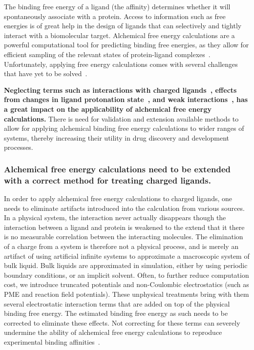 \documentclass[10pt,final]{article}
\begin{document}
The binding free energy of a ligand (the affinity) determines whether it will spontaneously associate with a protein.
%
Access to information such as free energies is of great help in the design of ligands that can selectively and tightly interact with a biomolecular target.
%
Alchemical free energy calculations are a powerful computational tool for predicting binding free energies, as they allow for efficient sampling of the relevant states of protein-ligand complexes~\cite{Shirts2007a}.
%
Unfortunately, applying free energy calculations comes with several challenges that have yet to be solved~\cite{Chodera2011a,Gapsys2015a}. 

%
\textbf{Neglecting terms such as interactions with charged ligands~\cite{Rocklin2013b,Muddana2014a},
effects from changes in ligand protonation state~\cite{Aleksandrov2007a,Czodrowski2007a,Steuber2007a,Czodrowski2007b},
and weak interactions~\cite{Gilson1997a}, has a great impact on the applicability of alchemical free energy calculations.
}%
There is need for validation  and extension available methods to allow for applying alchemical binding free energy calculations to wider ranges of systems,
thereby increasing their utility in drug discovery and development processes.


\subsubsection*{Alchemical free energy calculations need to be extended with a correct method for treating charged ligands.}
In order to apply alchemical free energy calculations to charged ligands, one needs to eliminate artifacts introduced into the calculation from various sources.
%
In a physical system, the interaction never actually disappears though the interaction between a ligand and protein is weakened to the extend that it there is no measurable correlation between the interacting molecules.
%
The elimination of a charge from a system is therefore not a physical process, and is merely an artifact of using artificial infinite systems to approximate a macroscopic system of bulk liquid.
%
Bulk liquids are approximated in simulation, either by using periodic boundary conditions, or an implicit solvent.
%
Often, to further reduce computation cost, we introduce truncated potentials and non-Coulombic electrostatics (such as PME and reaction field potentials). 
%
These unphysical treatments bring with them several electrostatic interaction terms that are added on top of the physical binding free energy.
%
The estimated binding free energy as such needs to be corrected to eliminate these effects.
%
Not correcting for these terms can severely undermine the ability of alchemical free energy calculations to reproduce experimental binding affinities~\cite{Rocklin2013b,Muddana2014a}.
\end{document}

